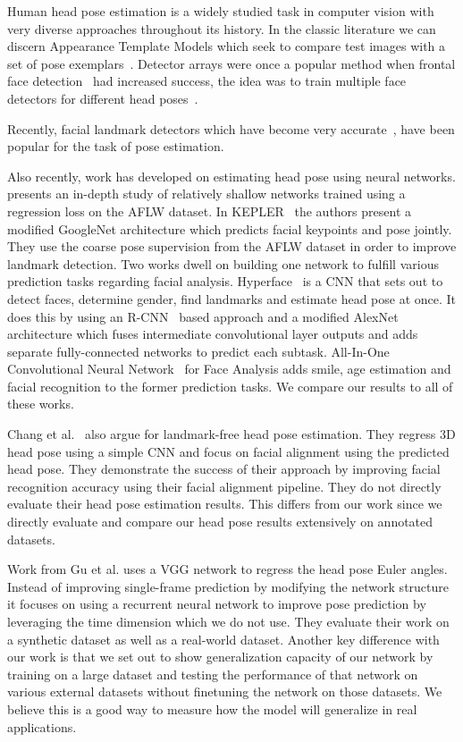 \documentclass[10pt,twocolumn,letterpaper]{article}
\begin{document}
Human head pose estimation is a widely studied task in computer vision with very diverse approaches throughout its history. In the classic literature we can discern Appearance Template Models which seek to compare test images with a set of pose exemplars~\cite{s88, s110, s111}. Detector arrays were once a popular method when frontal face detection~\cite{s97,s104} had increased success, the idea was to train multiple face detectors for different head poses~\cite{s47, s146}.

Recently, facial landmark detectors which have become very accurate~\cite{bulat2017far,zhu2016face,KEPLER}, have been popular for the task of pose estimation.

Also recently, work has developed on estimating head pose using neural networks. \cite{patacchiola2017head} presents an in-depth study of relatively shallow networks trained using a regression loss on the AFLW dataset. In KEPLER~\cite{KEPLER} the authors present a modified GoogleNet architecture which predicts facial keypoints and pose jointly. They use the coarse pose supervision from the AFLW dataset in order to improve landmark detection. Two works dwell on building one network to fulfill various prediction tasks regarding facial analysis. Hyperface~\cite{ranjan2016hyperface} is a CNN that sets out to detect faces, determine gender, find landmarks and estimate head pose at once. It does this by using an R-CNN~\cite{girshick14CVPR} based approach and a modified AlexNet architecture which fuses intermediate convolutional layer outputs and adds separate fully-connected networks to predict each subtask. All-In-One Convolutional Neural Network~\cite{allinone} for Face Analysis adds smile, age estimation and facial recognition to the former prediction tasks. We compare our results to all of these works.

Chang et al.~\cite{chang2017faceposenet} also argue for landmark-free head pose estimation. They regress 3D head pose using a simple CNN and focus on facial alignment using the predicted head pose. They demonstrate the success of their approach by improving facial recognition accuracy using their facial alignment pipeline. They do not directly evaluate their head pose estimation results. This differs from our work since we directly evaluate and compare our head pose results extensively on annotated datasets.

Work from Gu et al.\cite{nvidia} uses a VGG network to regress the head pose Euler angles. Instead of improving single-frame prediction by modifying the network structure it focuses on using a recurrent neural network to improve pose prediction by leveraging the time dimension which we do not use. They evaluate their work on a synthetic dataset as well as a real-world dataset. Another key difference with our work is that we set out to show generalization capacity of our network by training on a large dataset and testing the performance of that network on various external datasets without finetuning the network on those datasets. We believe this is a good way to measure how the model will generalize in real applications.
\end{document}
